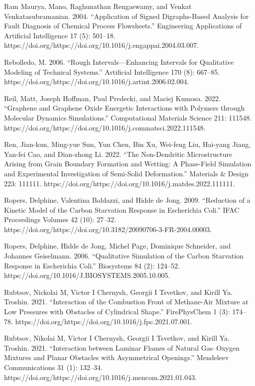 \documentclass[utf8]{gradu3}
\begin{document}
Ram Maurya, Mano, Raghunathan Rengaswamy, and Venkat Venkatasubramanian. 2004. “Application of Signed Digraphs-Based Analysis for Fault Diagnosis of Chemical Process Flowsheets.” Engineering Applications of Artificial Intelligence 17 (5): 501–18. https://doi.org/https://doi.org/10.1016/j.engappai.2004.03.007.

Rebolledo, M. 2006. “Rough Intervals—Enhancing Intervals for Qualitative Modeling of Technical Systems.” Artificial Intelligence 170 (8): 667–85. https://doi.org/https://doi.org/10.1016/j.artint.2006.02.004.

Reil, Matt, Joseph Hoffman, Paul Predecki, and Maciej Kumosa. 2022. “Graphene and Graphene Oxide Energetic Interactions with Polymers through Molecular Dynamics Simulations.” Computational Materials Science 211: 111548. https://doi.org/https://doi.org/10.1016/j.commatsci.2022.111548.

Ren, Jian-kun, Ming-yue Sun, Yun Chen, Bin Xu, Wei-feng Liu, Hai-yang Jiang, Yan-fei Cao, and Dian-zhong Li. 2022. “The Non-Dendritic Microstructure Arising from Grain Boundary Formation and Wetting: A Phase-Field Simulation and Experimental Investigation of Semi-Solid Deformation.” Materials \& Design 223: 111111. https://doi.org/https://doi.org/10.1016/j.matdes.2022.111111.

Ropers, Delphine, Valentina Baldazzi, and Hidde de Jong. 2009. “Reduction of a Kinetic Model of the Carbon Starvation Response in Escherichia Coli.” IFAC Proceedings Volumes 42 (10): 27–32. https://doi.org/https://doi.org/10.3182/20090706-3-FR-2004.00003.

Ropers, Delphine, Hidde de Jong, Michel Page, Dominique Schneider, and Johannes Geiselmann. 2006. “Qualitative Simulation of the Carbon Starvation Response in Escherichia Coli.” Biosystems 84 (2): 124–52. https://doi.org/10.1016/J.BIOSYSTEMS.2005.10.005.

Rubtsov, Nickolai M, Victor I Chernysh, Georgii I Tsvetkov, and Kirill Ya. Troshin. 2021. “Interaction of the Combustion Front of Methane-Air Mixture at Low Pressures with Obstacles of Cylindrical Shape.” FirePhysChem 1 (3): 174–78. https://doi.org/https://doi.org/10.1016/j.fpc.2021.07.001.

Rubtsov, Nikolai M, Victor I Chernysh, Georgii I Tsvetkov, and Kirill Ya. Troshin. 2021. “Interaction between Laminar Flames of Natural Gas–Oxygen Mixtures and Planar Obstacles with Asymmetrical Openings.” Mendeleev Communications 31 (1): 132–34. https://doi.org/https://doi.org/10.1016/j.mencom.2021.01.043.
\end{document}
